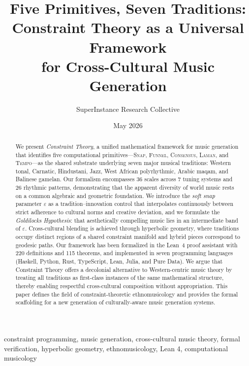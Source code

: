 \documentclass[cmj]{article}
\title{Five Primitives, Seven Traditions:\\Constraint Theory as a Universal Framework\\for Cross-Cultural Music Generation}
\author{SuperInstance Research Collective}
\date{May 2026}
\newcommand{\eps}{\varepsilon}
\newcommand{\SNAP}{\textsc{Snap}}
\newcommand{\FUNNEL}{\textsc{Funnel}}
\newcommand{\CONSENSUS}{\textsc{Consensus}}
\newcommand{\LAMAN}{\textsc{Laman}}
\newcommand{\TEMPO}{\textsc{Tempo}}
\begin{document}
\maketitle

\begin{abstract}
We present \emph{Constraint Theory}, a unified mathematical framework for
music generation that identifies five computational primitives---\SNAP{},
\FUNNEL{}, \CONSENSUS{}, \LAMAN{}, and \TEMPO{}---as the shared substrate
underlying seven major musical traditions: Western tonal, Carnatic, Hindustani,
Jazz, West African polyrhythmic, Arabic maqam, and Balinese gamelan. Our
formalism encompasses 36 scales across 7 tuning systems and 26 rhythmic
patterns, demonstrating that the apparent diversity of world music rests on a
common algebraic and geometric foundation. We introduce the \emph{soft snap}
parameter $\eps$ as a tradition--innovation control that interpolates
continuously between strict adherence to cultural norms and creative deviation,
and we formulate the \emph{Goldilocks Hypothesis}: that aesthetically
compelling music lies in an intermediate band of $\eps$. Cross-cultural
blending is achieved through hyperbolic geometry, where traditions occupy
distinct regions of a shared constraint manifold and hybrid pieces correspond
to geodesic paths. Our framework has been formalized in the Lean~4 proof
assistant with 220 definitions and 115 theorems, and implemented in seven
programming languages (Haskell, Python, Rust, TypeScript, Lean, Julia, and
Pure Data). We argue that Constraint Theory offers a decolonial alternative to
Western-centric music theory by treating all traditions as first-class
instances of the same mathematical structure, thereby enabling respectful
cross-cultural composition without appropriation. This paper defines the field
of constraint-theoretic ethnomusicology and provides the formal scaffolding for
a new generation of culturally-aware music generation systems.
\end{abstract}

\begin{keywords}
constraint programming, music generation, cross-cultural music theory,
formal verification, hyperbolic geometry, ethnomusicology, Lean 4,
computational musicology
\end{keywords}

\end{document}
